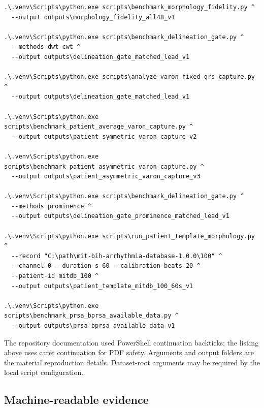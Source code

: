 \documentclass[11pt,a4paper]{article}
\begin{document}
\begin{lstlisting}
.\.venv\Scripts\python.exe scripts\benchmark_morphology_fidelity.py ^
  --output outputs\morphology_fidelity_all48_v1

.\.venv\Scripts\python.exe scripts\benchmark_delineation_gate.py ^
  --methods dwt cwt ^
  --output outputs\delineation_gate_matched_lead_v1

.\.venv\Scripts\python.exe scripts\analyze_varon_fixed_qrs_capture.py ^
  --output outputs\delineation_gate_matched_lead_v1

.\.venv\Scripts\python.exe scripts\benchmark_patient_average_varon_capture.py ^
  --output outputs\patient_symmetric_varon_capture_v2

.\.venv\Scripts\python.exe scripts\benchmark_patient_asymmetric_varon_capture.py ^
  --output outputs\patient_asymmetric_varon_capture_v3

.\.venv\Scripts\python.exe scripts\benchmark_delineation_gate.py ^
  --methods prominence ^
  --output outputs\delineation_gate_prominence_matched_lead_v1

.\.venv\Scripts\python.exe scripts\run_patient_template_morphology.py ^
  --record "C:\path\mit-bih-arrhythmia-database-1.0.0\100" ^
  --channel 0 --duration-s 60 --calibration-beats 20 ^
  --patient-id mitdb_100 ^
  --output outputs\patient_template_mitdb_100_60s_v1

.\.venv\Scripts\python.exe scripts\benchmark_prsa_bprsa_available_data.py ^
  --output outputs\prsa_bprsa_available_data_v1
\end{lstlisting}

The repository documentation used PowerShell continuation backticks; the listing above uses caret continuation for PDF safety. Arguments and output folders are the material reproduction details. Dataset-root arguments may be required by the local script configuration.

\subsection{Machine-readable evidence}
\end{document}
